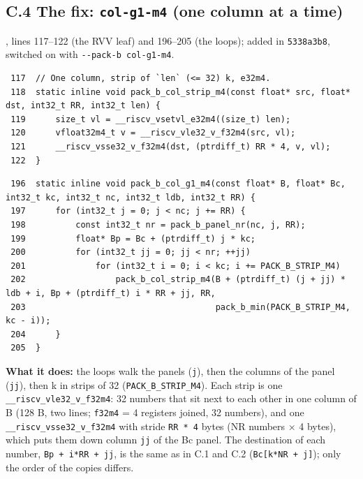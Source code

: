 \documentclass[10pt,a4paper]{article}
\begin{document}
\subsection*{C.4 The fix: \texttt{col-g1-m4} (one column at a time)}
, lines 117--122 (the RVV leaf) and 196--205 (the loops); added in
\texttt{5338a3b8}, switched on with \texttt{-{}-pack-b col-g1-m4}.
{\footnotesize\begin{verbatim}
 117  // One column, strip of `len` (<= 32) k, e32m4.
 118  static inline void pack_b_col_strip_m4(const float* src, float* dst, int32_t RR, int32_t len) {
 119      size_t vl = __riscv_vsetvl_e32m4((size_t) len);
 120      vfloat32m4_t v = __riscv_vle32_v_f32m4(src, vl);
 121      __riscv_vsse32_v_f32m4(dst, (ptrdiff_t) RR * 4, v, vl);
 122  }
\end{verbatim}}
{\scriptsize\begin{verbatim}
 196  static inline void pack_b_col_g1_m4(const float* B, float* Bc, int32_t kc, int32_t nc, int32_t ldb, int32_t RR) {
 197      for (int32_t j = 0; j < nc; j += RR) {
 198          const int32_t nr = pack_b_panel_nr(nc, j, RR);
 199          float* Bp = Bc + (ptrdiff_t) j * kc;
 200          for (int32_t jj = 0; jj < nr; ++jj)
 201              for (int32_t i = 0; i < kc; i += PACK_B_STRIP_M4)
 202                  pack_b_col_strip_m4(B + (ptrdiff_t) (j + jj) * ldb + i, Bp + (ptrdiff_t) i * RR + jj, RR,
 203                                      pack_b_min(PACK_B_STRIP_M4, kc - i));
 204      }
 205  }
\end{verbatim}}

\textbf{What it does:} the loops walk the panels (\texttt{j}), then the columns of the panel (\texttt{jj}), then k in strips of 32
(\texttt{PACK\_B\_STRIP\_M4}). Each strip is one \texttt{\_\_riscv\_vle32\_v\_f32m4}: 32 numbers that sit next to each other in one column of
B (128 B, two lines; \texttt{f32m4} = 4 registers joined, 32 numbers), and one \texttt{\_\_riscv\_vsse32\_v\_f32m4} with stride
\texttt{RR * 4} bytes (NR numbers $\times$ 4 bytes), which puts them down column
\texttt{jj} of the Bc panel. The destination of each number, \texttt{Bp + i*RR + jj}, is the same as in C.1 and C.2
(\texttt{Bc[k*NR + j]}); only the order of the copies differs.
\end{document}

